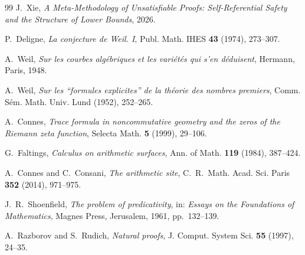 \documentclass[12pt]{article}
\begin{document}
\begin{thebibliography}{99}
J.~Xie, \emph{A Meta-Methodology of Unsatisfiable Proofs:
Self-Referential Safety and the Structure of Lower Bounds}, 2026.

P.~Deligne, \emph{La conjecture de Weil. I},
Publ. Math. IHES \textbf{43} (1974), 273--307.

A.~Weil, \emph{Sur les courbes alg\'ebriques et les vari\'et\'es
qui s'en d\'eduisent}, Hermann, Paris, 1948.

A.~Weil, \emph{Sur les ``formules explicites'' de la th\'eorie des
nombres premiers}, Comm. S\'em. Math. Univ. Lund (1952), 252--265.

A.~Connes, \emph{Trace formula in noncommutative geometry and the
zeros of the Riemann zeta function},
Selecta Math. \textbf{5} (1999), 29--106.

G.~Faltings, \emph{Calculus on arithmetic surfaces},
Ann. of Math. \textbf{119} (1984), 387--424.

A.~Connes and C.~Consani, \emph{The arithmetic site},
C.~R.~Math. Acad. Sci. Paris \textbf{352} (2014), 971--975.

J.~R.~Shoenfield, \emph{The problem of predicativity},
in: \emph{Essays on the Foundations of Mathematics},
Magnes Press, Jerusalem, 1961, pp.~132--139.

A.~Razborov and S.~Rudich, \emph{Natural proofs},
J. Comput. System Sci. \textbf{55} (1997), 24--35.
\end{thebibliography}
\end{document}
